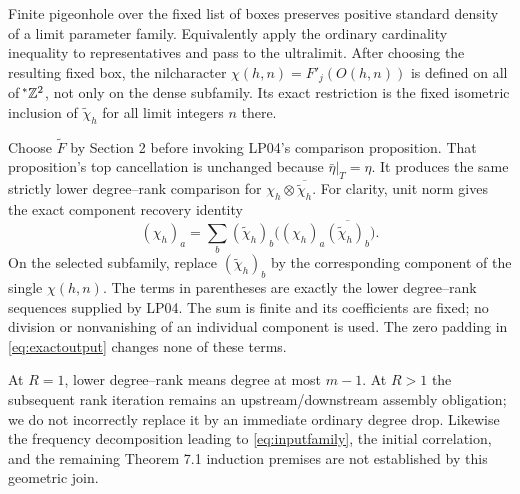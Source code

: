 \documentclass[11pt]{article}
\begin{document}
Finite pigeonhole over the fixed list of boxes preserves positive standard
density of a limit parameter family. Equivalently apply the ordinary
cardinality inequality to representatives and pass to the ultralimit.
After choosing the resulting fixed box, the nilcharacter
$\chi(h,n)=F'_j(O(h,n))$ is defined on all of $\!{}^*\mathbb Z^2$, not only
on the dense subfamily. Its exact restriction is the fixed isometric
inclusion of $\widetilde\chi_h$ for all limit integers $n$ there.

Choose $\widetilde F$ by Section 2 before invoking LP04's comparison
proposition. That proposition's top cancellation is unchanged because
$\bar\eta|_T=\eta$. It produces the same strictly lower degree--rank
comparison for $\chi_h\otimes\overline{\widetilde\chi_h}$.
For clarity, unit norm gives the exact component recovery identity
\[
 (\chi_h)_a=\sum_b (\widetilde\chi_h)_b
             \bigl((\chi_h)_a\overline{(\widetilde\chi_h)_b}\bigr).
\]
On the selected subfamily, replace $(\widetilde\chi_h)_b$ by the
corresponding component of the single $\chi(h,n)$. The terms in parentheses
are exactly the lower degree--rank sequences supplied by LP04. The sum
is finite and its coefficients are fixed; no division or nonvanishing of
an individual component is used. The zero padding in
\eqref{eq:exactoutput} changes none of these terms.

At $R=1$, lower degree--rank means degree at most $m-1$. At $R>1$
the subsequent rank iteration remains an upstream/downstream assembly
obligation; we do not incorrectly replace it by an immediate ordinary
degree drop. Likewise the frequency decomposition leading to
\eqref{eq:inputfamily}, the initial correlation, and the remaining
Theorem 7.1 induction premises are not established by this geometric join.
\end{document}
